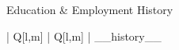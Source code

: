 \begin{adjustwidth}{4mm}{}
    \fontsize{7mm}{8mm}\selectfont
    \color{highlightcolor}
    Education \& Employment History
    \begin{adjustwidth}{4mm}{}
        \fontsize{3mm}{4mm}\selectfont
        \color{black}
        \begin{tblr}{ | Q[l,m] | Q[l,m] | }
            __history__
        \end{tblr}
    \end{adjustwidth}
\end{adjustwidth}